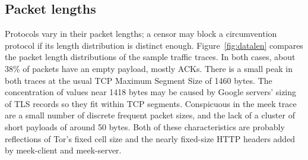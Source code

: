 \documentclass{sig-alternate}
\newcommand{\meekclient}{\mbox{meek-client}\xspace}
\newcommand{\meekserver}{\mbox{meek-server}\xspace}
\newcommand{\meek}{meek\xspace}
\begin{document}
\subsection{Packet lengths}

Protocols vary in their packet lengths;
a censor may block a circumvention protocol if its length distribution
is distinct enough.
Figure~\ref{fig:datalen}
compares the packet length distributions of the sample traffic traces.
In both cases, about 38\% of packets have an empty payload, mostly ACKs.
There is a small peak in both traces at the usual TCP Maximum Segment Size
of 1460 bytes.
The concentration of values near 1418 bytes
may be caused by Google servers' sizing of TLS records so they fit within TCP segments.
Conspicuous in the \meek trace are a small number of
discrete frequent packet sizes,
and the lack of a cluster of short payloads of around 50 bytes.
Both of these characteristics are probably reflections
of Tor's fixed cell size and the nearly fixed-size HTTP headers
added by \meekclient and \meekserver.

%

\end{document}
